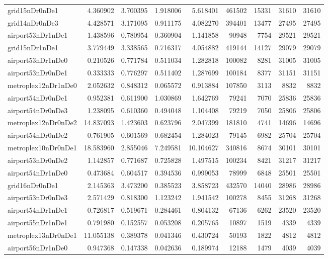 \documentclass[../../../thesis.tex]{subfiles}
\begin{document}
\begin{longtable}{|l|r|r|r|r|r|r|r|r|}
grid15nDr0nDe1 & 4.360902 & 3.700395 & 1.918006 & 5.618401 & 461502 & 15331 & 31610 & 31610 \\
grid14nDr0nDe3 & 4.428571 & 3.171095 & 0.911175 & 4.082270 & 394401 & 13477 & 27495 & 27495 \\
airport53nDr1nDe1 & 1.438596 & 0.780954 & 0.360904 & 1.141858 & 90948 & 7754 & 29521 & 29521 \\
grid15nDr1nDe1 & 3.779449 & 3.338565 & 0.716317 & 4.054882 & 419144 & 14127 & 29079 & 29079 \\
airport53nDr1nDe0 & 0.210526 & 0.771784 & 0.511034 & 1.282818 & 100082 & 8281 & 31005 & 31005 \\
airport53nDr0nDe1 & 0.333333 & 0.776297 & 0.511402 & 1.287699 & 100184 & 8377 & 31151 & 31151 \\
metroplex12nDr1nDe0 & 2.052632 & 0.848312 & 0.065572 & 0.913884 & 107850 & 3113 & 8832 & 8832 \\
airport54nDr0nDe1 & 0.952381 & 0.611900 & 1.030869 & 1.642769 & 79241 & 7070 & 25836 & 25836 \\
airport54nDr0nDe3 & 1.238095 & 0.610360 & 0.494048 & 1.104408 & 79219 & 7050 & 25806 & 25806 \\
metroplex12nDr0nDe2 & 14.837093 & 1.423603 & 0.623796 & 2.047399 & 181810 & 4741 & 14696 & 14696 \\
airport54nDr0nDe2 & 0.761905 & 0.601569 & 0.682454 & 1.284023 & 79145 & 6982 & 25704 & 25704 \\
metroplex10nDr0nDe1 & 18.583960 & 2.855046 & 7.249581 & 10.104627 & 340816 & 8674 & 30101 & 30101 \\
airport53nDr0nDe2 & 1.142857 & 0.771687 & 0.725828 & 1.497515 & 100234 & 8421 & 31217 & 31217 \\
airport54nDr1nDe0 & 0.473684 & 0.604517 & 0.394536 & 0.999053 & 78999 & 6848 & 25501 & 25501 \\
grid16nDr0nDe1 & 2.145363 & 3.473200 & 0.385523 & 3.858723 & 432570 & 14040 & 28986 & 28986 \\
airport53nDr0nDe3 & 2.571429 & 0.818300 & 1.123242 & 1.941542 & 100278 & 8455 & 31268 & 31268 \\
airport54nDr1nDe1 & 0.726817 & 0.519671 & 0.284461 & 0.804132 & 67136 & 6262 & 23520 & 23520 \\
airport55nDr1nDe1 & 0.791980 & 0.152557 & 0.053208 & 0.205765 & 10897 & 1519 & 4339 & 4339 \\
metroplex13nDr0nDe1 & 11.055138 & 0.389378 & 0.041346 & 0.430724 & 50193 & 1822 & 4812 & 4812 \\
airport56nDr1nDe0 & 0.947368 & 0.147338 & 0.042636 & 0.189974 & 12188 & 1479 & 4039 & 4039 \\

\end{longtable}
\end{document}
